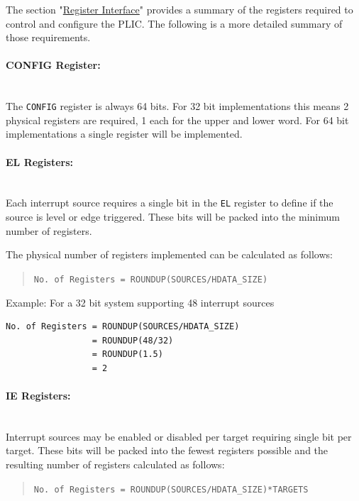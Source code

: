 The section "\protect\hyperlink{register-interface}{Register Interface}" provides a summary of the registers required to control and configure
the PLIC.
The following is a more detailed summary of those requirements.

\paragraph{CONFIG Register:} ~\\

The \texttt{CONFIG} register is always 64 bits.
For 32 bit implementations this means 2 physical registers are required, 1 each for the upper and lower word.
For 64 bit implementations a single register will be implemented.

\paragraph{EL Registers:} ~\\

Each interrupt source requires a single bit in the \texttt{EL} register to define if the source is level or edge triggered.
These bits will be packed into the minimum number of registers.

The physical number of registers implemented can be calculated as follows:

\begin{quote}
\texttt{No.\ of\ Registers\ =\ ROUNDUP(SOURCES/HDATA\_SIZE)}
\end{quote}

Example: For a 32 bit system supporting 48 interrupt sources

\begin{verbatim}
No. of Registers = ROUNDUP(SOURCES/HDATA_SIZE)   
                 = ROUNDUP(48/32)
                 = ROUNDUP(1.5)
                 = 2
\end{verbatim}

\paragraph{IE Registers:} ~\\

Interrupt sources may be enabled or disabled per target requiring single bit per target.
These bits will be packed into the fewest registers possible and the resulting number of registers calculated as follows:

\begin{quote}
\texttt{No.\ of\ Registers\ =\ ROUNDUP(SOURCES/HDATA\_SIZE)*TARGETS}
\end{quote}

